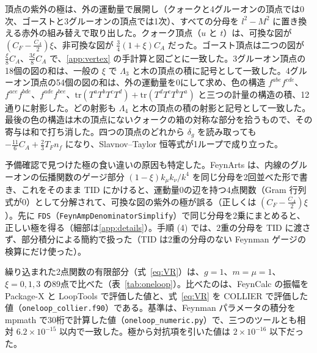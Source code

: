 \documentclass[a4paper,10pt]{ltjsarticle}
\begin{document}
頂点の紫外の極は、外の運動量で展開し（クォークと4グルーオンの頂点では0次、ゴーストと3グルーオンの頂点では1次）、すべての分母を $l^2-M^2$ に置き換える赤外の組み替えで取り出した。クォーク頂点（$u$ と $t$）は、可換な図が $(C_F-\frac{C_A}2)\xi$、非可換な図が $\frac34(1+\xi)C_A$ だった。ゴースト頂点は二つの図が $\frac\xi8C_A$、$\frac{3\xi}8C_A$ で、\ref{app:vertex} の手計算と図ごとに一致した。3グルーオン頂点の18個の図の和は、一般の $\xi$ で $\Lambda_3$ と木の頂点の積に記号として一致した。4グルーオン頂点の54個の図の和は、外の運動量を0にして求め、色の構造 $f^{abe}f^{cde}$、$f^{ace}f^{bde}$、$f^{ade}f^{bce}$、$\mathrm{tr}(T^aT^bT^cT^d)+\mathrm{tr}(T^dT^cT^bT^a)$ と三つの計量の構造の積、12通りに射影した。どの射影も $\Lambda_4$ と木の頂点の積の射影と記号として一致した。最後の色の構造は木の頂点にないクォークの箱の対称な部分を拾うもので、その寄与は和で打ち消した。四つの頂点のどれから $\delta_g$ を読み取っても $-\frac{11}6C_A+\frac23T_Fn_f$ になり、Slavnov--Taylor 恒等式が1ループで成り立った。

予備確認で見つけた極の食い違いの原因も特定した。FeynArts は、内線のグルーオンの伝播関数のゲージ部分 $(1-\xi)k_\mu k_\nu/k^4$ を同じ分母を2回並べた形で書き、これをそのまま TID にかけると、運動量0の辺を持つ4点関数（Gram 行列式が0）として分解されて、可換な図の紫外の極が誤る（正しくは $(C_F-\frac{C_A}2)\xi$）。先に \texttt{FDS}（\texttt{FeynAmpDenominatorSimplify}）で同じ分母を2乗にまとめると、正しい極を得る（細部は\ref{app:details}）。手順 (4) では、2重の分母を TID に渡さず、部分積分による簡約で扱った（TID は2重の分母のない Feynman ゲージの検算にだけ使った）。

繰り込まれた2点関数の有限部分（式~\eqref{eq:VR}）は、$g=1$、$m=\mu=1$、$\xi=0,1,3$ の89点で比べた（表~\ref{tab:oneloop}）。比べたのは、FeynCalc の振幅を Package-X と LoopTools で評価した値と、式~\eqref{eq:VR} を COLLIER で評価した値（\texttt{oneloop\_collier.f90}）である。基準は、Feynman パラメータの積分を mpmath で30桁で計算した値（\texttt{oneloop\_numeric.py}）で、三つのツールとも相対 $6.2\times10^{-15}$ 以内で一致した。極から対抗項を引いた値は $2\times10^{-16}$ 以下だった。
\end{document}
